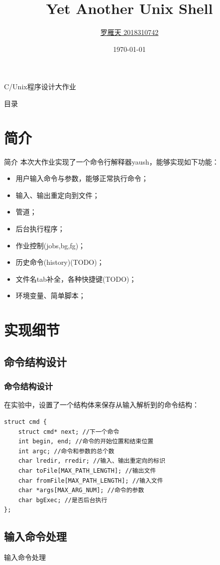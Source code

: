 \documentclass[10pt]{beamer}
\title{Yet Another Unix Shell }
\author{\href{mailto:luoyt14thu@gmail.com}{罗雁天 2018310742}}
\date{\today}
\begin{document}
\begin{frame}{C/Unix程序设计大作业}
\titlepage
\end{frame}

\begin{frame}{目录}
\tableofcontents
\end{frame}

\section{简介}

\begin{frame}{简介}
本次大作业实现了一个命令行解释器yaush，能够实现如下功能：

\begin{itemize}
	\item 用户输入命令与参数，能够正常执行命令；
	\item 输入、输出重定向到文件；
	\item 管道；
	\item 后台执行程序；
	\item 作业控制(jobs,bg,fg)；
	\item 历史命令(history)(TODO)；
	\item 文件名tab补全，各种快捷键(TODO)；
	\item 环境变量、简单脚本；
\end{itemize}
\end{frame}

\section{实现细节}
\subsection{命令结构设计}
\begin{frame}[fragile]
\frametitle{命令结构设计}
在实验中，设置了一个结构体来保存从输入解析到的命令结构：
\begin{lstlisting}
struct cmd {
    struct cmd* next; //下一个命令
    int begin, end; //命令的开始位置和结束位置
    int argc; //命令和参数的总个数
    char lredir, rredir; //输入、输出重定向的标识
    char toFile[MAX_PATH_LENGTH]; //输出文件
    char fromFile[MAX_PATH_LENGTH]; //输入文件
    char *args[MAX_ARG_NUM]; //命令的参数
    char bgExec; //是否后台执行
};
\end{lstlisting}
\end{frame}

\subsection{输入命令处理}
\begin{frame}{输入命令处理}

\end{frame}
\end{document}
